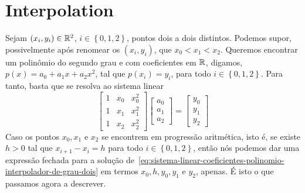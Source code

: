 \section{Interpolation}

Sejam \((x_{i},y_{i})\in\mathbb{R}^{2}\), \(i\in\left\{0,1,2\right\}\),
pontos dois a dois distintos. Podemos supor, possivelmente após renomear os
\((x_{i},y_{i})\), que \(x_{0}<x_{1}<x_{2}\). Queremos encontrar um polinômio
do segundo grau e com coeficientes em \(\mathbb{R}\), digamos,
\(p{\left(x\right)}=a_{0}+a_{1}x+a_{2}x^{2}\), tal que \(p(x_{i})=y_{i}\), para
todo \(i\in\left\{0,1,2\right\}\). Para tanto, basta que se resolva ao sistema
linear
\begin{equation}\label{eq:sistema-linear-coeficientes-polinomio-interpolador-de-grau-dois}
  \begin{bmatrix}
    1 & x_{0} & x_{0}^{2} \\
    1 & x_{1} & x_{1}^{2} \\
    1 & x_{2} & x_{2}^{2}
  \end{bmatrix}
  \begin{bmatrix}
    a_{0} \\ a_{1} \\ a_{2}
  \end{bmatrix}
  =
  \begin{bmatrix}
    y_{0} \\ y_{1} \\ y_{2}
  \end{bmatrix}
\end{equation}
Caso os pontos \(x_{0},x_{1}\) e \(x_{2}\) se encontrem em progressão
aritmética, isto é, se existe \(h>0\) tal que \(x_{i+1}-x_{i}=h\) para todo
\(i\in\left\{0,1,2\right\}\), então nós podemos dar uma expressão fechada para
a solução
de~\eqref{eq:sistema-linear-coeficientes-polinomio-interpolador-de-grau-dois}
em termos \(x_{0},h,y_{0},y_{1}\) e \(y_{2}\), apenas. É isto o que passamos
agora a descrever.

